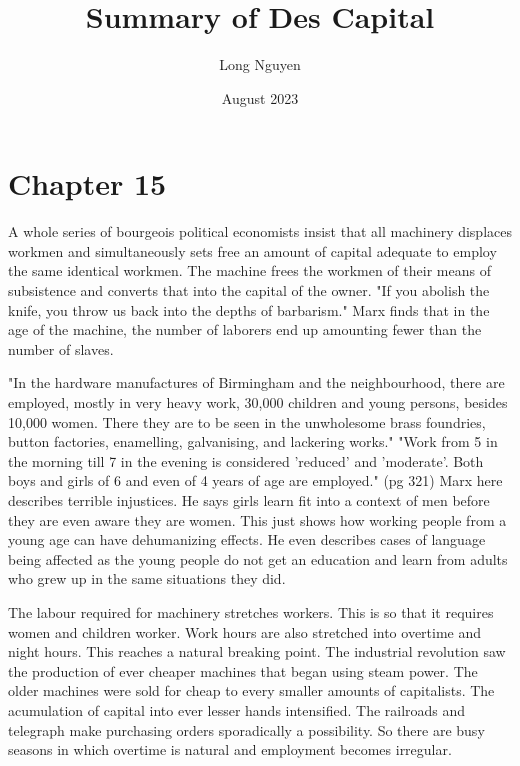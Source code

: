 \documentclass{article}
\title{Summary of Des Capital}
\author{Long Nguyen}
\date{August 2023}
\begin{document}
\maketitle

\section{Chapter 15}
A whole series of bourgeois political economists insist that all machinery displaces workmen and simultaneously sets free an amount of capital adequate to employ the same identical workmen. The machine frees the workmen of their means of subsistence and converts that into the capital of the owner. "If you abolish the knife, you throw us back into the depths of barbarism." Marx finds that in the age of the machine, the number of laborers end up amounting fewer than the number of slaves.

"In the hardware manufactures of Birmingham and the neighbourhood, there are employed, mostly in very heavy work, 30,000 children and young persons, besides 10,000 women. There they are to be seen in the unwholesome brass foundries, button factories, enamelling, galvanising, and lackering works." "Work from 5 in the morning till 7 in the evening is considered 'reduced' and 'moderate'. Both boys and girls of 6 and even of 4 years of age are employed." (pg 321) Marx here describes terrible injustices. He says girls learn fit into a context of men before they are even aware they are women. This just shows how working people from a young age can have dehumanizing effects. He even describes cases of language being affected as the young people do not get an education and learn from adults who grew up in the same situations they did. 

The labour required for machinery stretches workers. This is so that it requires women and children worker. Work hours are also stretched into overtime and night hours. This reaches a natural breaking point. The industrial revolution saw the production of ever cheaper machines that began using steam power. The older machines were sold for cheap to every smaller amounts of capitalists. The acumulation of capital into ever lesser hands intensified. The railroads and telegraph make purchasing orders sporadically a possibility. So there are busy seasons in which overtime is natural and employment becomes irregular.
\end{document}
